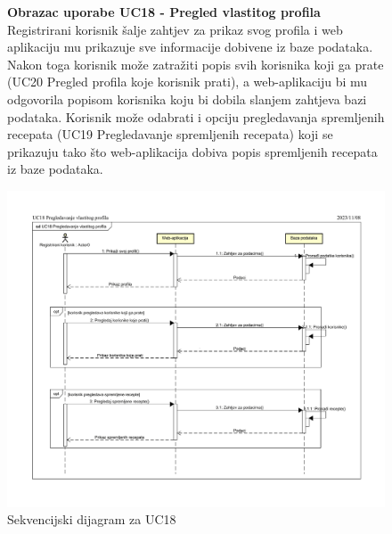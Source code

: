 			\begin{figure}[H]
				\textbf{Obrazac uporabe UC18 - Pregled vlastitog profila}\\

				Registrirani korisnik šalje zahtjev za prikaz svog profila i web aplikaciju mu prikazuje sve informacije dobivene iz baze podataka. Nakon toga korisnik može zatražiti popis svih korisnika koji ga prate (UC20 Pregled profila koje korisnik prati), a web-aplikaciju bi mu odgovorila popisom korisnika koju bi dobila slanjem zahtjeva bazi podataka.
				Korisnik može odabrati i opciju pregledavanja spremljenih recepata (UC19 Pregledavanje spremljenih recepata) koji se prikazuju tako što web-aplikacija dobiva popis spremljenih recepata iz baze podataka.
				\begin{center}
					\includegraphics[scale = 0.8]{slike/SEK_UC18_Pregledavanje_vlastitog_profila.png}
					\caption{Sekvencijski dijagram za UC18}
					\label{fig:Sek_UC18}
				\end{center}
			\end{figure}

